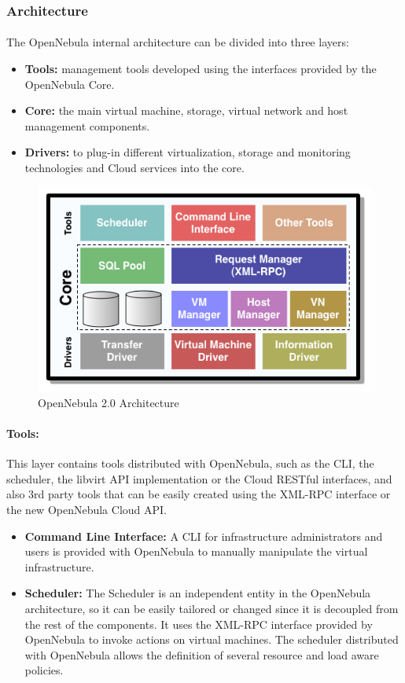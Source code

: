 \subsubsection{Architecture }
\paragraph{}The OpenNebula internal architecture can be divided into three layers: 
\begin{itemize}
 \item \textbf{Tools: }management tools developed using the interfaces provided by the OpenNebula Core.
 \item \textbf{Core: }the main virtual machine, storage, virtual network and host management components.
 \item \textbf{Drivers: }to plug-in different virtualization, storage and monitoring technologies and Cloud services into the core.
\end{itemize}

\begin{figure}[!h]
\center
\includegraphics[height=7 cm]{./images/platform/OpenNebula/one-architecture} 
\caption{OpenNebula 2.0 Architecture }
\end{figure}

\paragraph{Tools: }
This layer contains tools distributed with OpenNebula, such as the CLI, the scheduler, the libvirt API implementation or the Cloud RESTful interfaces, and also 3rd party tools that can be easily created using the XML-RPC interface or the new OpenNebula Cloud API. 
\begin{itemize}
 \item \textbf{Command Line Interface: }A CLI for infrastructure administrators and users is provided with OpenNebula to manually manipulate the virtual infrastructure.
 \item \textbf{Scheduler: }The Scheduler is an independent entity in the OpenNebula architecture, so it can be easily tailored or changed since it is decoupled from the rest of the components. It uses the XML-RPC interface provided by OpenNebula to invoke actions on virtual machines. The scheduler distributed with OpenNebula allows the definition of several resource and load aware policies. 
\end{itemize}


